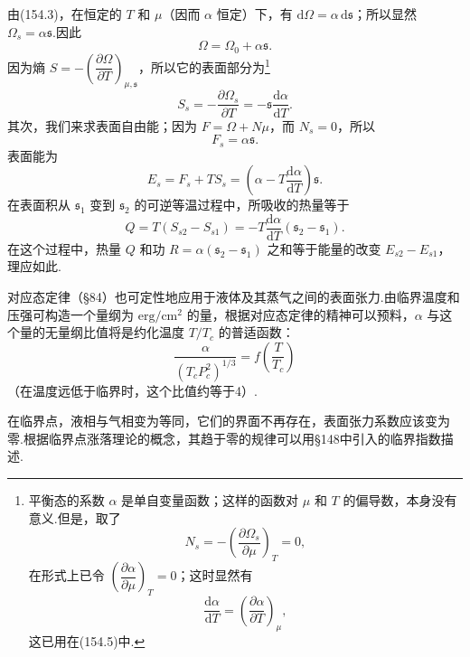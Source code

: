 由(154.3)，在恒定的 $T$ 和 $\mu$（因而 $\alpha$ 恒定）下，有 $\mathrm{d}\Omega=\alpha\,\mathrm{d}\mathfrak{s}$；所以显然 $\Omega_s=\alpha\mathfrak{s}$.因此
\begin{equation}
  \Omega=\Omega_0+\alpha\mathfrak{s}.
\end{equation}
因为熵 $S=-\left(\dfrac{\partial\Omega}{\partial T}\right)_{\mu,\mathfrak{s}}$，所以它的表面部分为\footnote{平衡态的系数 $\alpha$ 是单自变量函数；这样的函数对 $\mu$ 和 $T$ 的偏导数，本身没有意义.但是，取了
\begin{equation*}
  N_s=-\left(\frac{\partial\Omega_s}{\partial\mu}\right)_T=0,
\end{equation*}
在形式上已令 $\left(\dfrac{\partial\alpha}{\partial\mu}\right)_T=0$；这时显然有
\begin{equation*}
  \frac{\mathrm{d}\alpha}{\mathrm{d}T}=\left(\frac{\partial\alpha}{\partial T}\right)_\mu,
\end{equation*}
这已用在(154.5)中.}
\begin{equation}
  S_s=-\frac{\partial\Omega_s}{\partial T}
  =-\mathfrak{s}\frac{\mathrm{d}\alpha}{\mathrm{d}T}.
\end{equation}
其次，我们来求表面自由能；因为 $F=\Omega+N\mu$，而 $N_s=0$，所以
\begin{equation}
  F_s=\alpha\mathfrak{s}.
\end{equation}
表面能为
\begin{equation}
  E_s=F_s+TS_s
  =\left(\alpha-T\frac{\mathrm{d}\alpha}{\mathrm{d}T}\right)\mathfrak{s}.
\end{equation}
在表面积从 $\mathfrak{s}_1$ 变到 $\mathfrak{s}_2$ 的可逆等温过程中，所吸收的热量等于
\begin{equation}
  Q=T(S_{s2}-S_{s1})
  =-T\frac{\mathrm{d}\alpha}{\mathrm{d}T}
  (\mathfrak{s}_2-\mathfrak{s}_1).
\end{equation}
在这个过程中，热量 $Q$ 和功 $R=\alpha(\mathfrak{s}_2-\mathfrak{s}_1)$ 之和等于能量的改变 $E_{s2}-E_{s1}$，理应如此.

对应态定律（§84）也可定性地应用于液体及其蒸气之间的表面张力.由临界温度和压强可构造一个量纲为 $\mathrm{erg/cm^2}$ 的量，根据对应态定律的精神可以预料，$\alpha$ 与这个量的无量纲比值将是约化温度 $T/T_c$ 的普适函数：
\begin{equation}
  \frac{\alpha}{(T_cP_c^2)^{1/3}}=f\left(\frac{T}{T_c}\right)
\end{equation}
（在温度远低于临界时，这个比值约等于4）.

在临界点，液相与气相变为等同，它们的界面不再存在，表面张力系数应该变为零.根据临界点涨落理论的概念，其趋于零的规律可以用§148中引入的临界指数描述.

